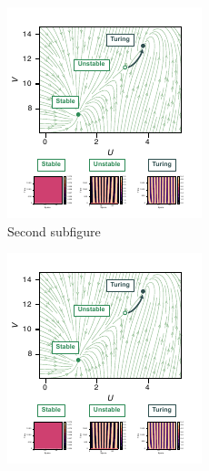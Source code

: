 \begin{figure}[H]
\begin{subfigure}{.5\linewidth}
            \includegraphics[width=\linewidth]{chapters/Chapter 1/multistability1}
            \caption{Second subfigure}
        \end{subfigure}
        \newline
        \begin{subfigure}{.5\linewidth}
            \centering
            \includegraphics[width=\linewidth]{chapters/Chapter 1/multistability1}

\end{subfigure}
\end{figure}
